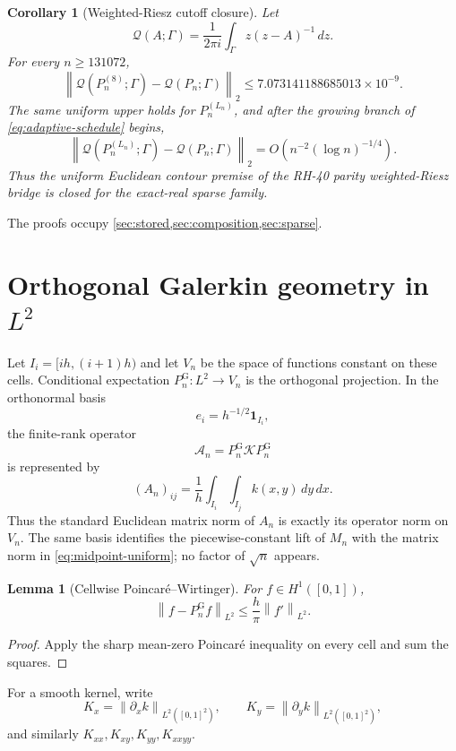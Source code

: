 \documentclass[11pt]{article}
\newtheorem{lemma}[theorem]{Lemma}
\newtheorem{corollary}[theorem]{Corollary}
\theoremstyle{definition}
\theoremstyle{remark}
\newcommand{\cA}{\mathcal A}
\newcommand{\cK}{\mathcal K}
\newcommand{\cQ}{\mathcal Q}
\newcommand{\norm}[1]{\left\lVert #1\right\rVert}
\begin{document}
\begin{corollary}[Weighted-Riesz cutoff closure]
\label{cor:riesz}
Let
\[
 \cQ(A;\Gamma)
 =\frac{1}{2\pi i}\int_\Gamma z(z-A)^{-1}\,dz.
\]
For every $n\ge131072$,
\[
 \norm{\cQ(P_n^{(8)};\Gamma)-\cQ(P_n;\Gamma)}_2
 \le7.073141188685013\times10^{-9}.
\]
The same uniform upper holds for $P_n^{(L_n)}$, and after the growing branch
of \eqref{eq:adaptive-schedule} begins,
\[
 \norm{\cQ(P_n^{(L_n)};\Gamma)-\cQ(P_n;\Gamma)}_2
 =
 O\!\left(n^{-2}(\log n)^{-1/4}\right).
\]
Thus the uniform Euclidean contour premise of the RH-40 parity
weighted-Riesz bridge is closed for the exact-real sparse family.
\end{corollary}

The proofs occupy \cref{sec:stored,sec:composition,sec:sparse}.

\section{Orthogonal Galerkin geometry in \texorpdfstring{$L^2$}{L2}}
\label{sec:hilbert}

Let $I_i=[ih,(i+1)h)$ and let $V_n$ be the space of functions constant on
these cells.  Conditional expectation $P_n^{\mathrm G}:L^2\to V_n$ is the
orthogonal projection.  In the orthonormal basis
\[
 e_i=h^{-1/2}\mathbf1_{I_i},
\]
the finite-rank operator
\[
 \cA_n=P_n^{\mathrm G}\cK P_n^{\mathrm G}
\]
is represented by
\begin{equation}
 (A_n)_{ij}
 =\frac1h\int_{I_i}\int_{I_j}k(x,y)\,dy\,dx.
 \label{eq:galerkin}
\end{equation}
Thus the standard Euclidean matrix norm of $A_n$ is exactly its operator norm
on $V_n$.  The same basis identifies the piecewise-constant lift of $M_n$
with the matrix norm in \eqref{eq:midpoint-uniform}; no factor of
$\sqrt n$ appears.

\begin{lemma}[Cellwise Poincar\'e--Wirtinger]
\label{lem:poincare}
For $f\in H^1([0,1])$,
\[
 \norm{f-P_n^{\mathrm G}f}_{L^2}
 \le\frac h\pi\norm{f'}_{L^2}.
\]
\end{lemma}

\begin{proof}
Apply the sharp mean-zero Poincar\'e inequality on every cell and sum the
squares.
\end{proof}

For a smooth kernel, write
\[
 K_x=\norm{\partial_xk}_{L^2([0,1]^2)},\qquad
 K_y=\norm{\partial_yk}_{L^2([0,1]^2)},
\]
and similarly $K_{xx},K_{xy},K_{yy},K_{xxyy}$.
\end{document}
